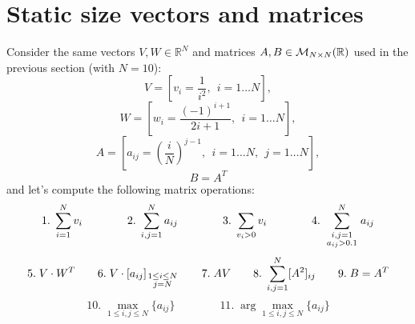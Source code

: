 

\FloatBarrier


\newpage 
\section{Static size vectors and matrices} 

Consider the same vectors $V, W \in \mathbb{R}^N$ and matrices $A, B \in { \cal{M}}_{N \times N} (\mathbb{R})$ used in the previous section (with $N=10$): 
$$
V = \left[ v_i =\frac{1}{i^2}, \ \ i = 1 \ldots  N \right],
$$
$$
W = \left[ w_i = \frac{(-1)^{i+1}}{2i+1}, \ \ i = 1 \ldots  N \right],
$$
$$
A = \left[ a_{ij} = \left( \frac{i}{N} \right)^{j-1}, \ \ i = 1 \ldots  N, \ \ j = 1 \ldots  N \right],
$$
$$
B = A^T
$$
and let's compute the following matrix operations:
$$
1.\;\sum_{i=1}^N v_i  \qquad \qquad 2.\;\sum_{i,j=1}^N a_{ij}   \qquad \qquad   3.\;\sum_{v_i>0} v_i   \qquad \qquad 4.\;\sum_{\scriptstyle i,j=1 \atop \scriptstyle a_{ij} > 0.1}^N a_{ij}   
$$
$$
5.\; V\cdot W^T    \quad \quad      6.\; V\cdot [a_{ij}]_{\scriptstyle 1\leq i\leq N \atop \scriptstyle j = N}    \quad  \quad  7.\; AV     \quad \quad   8.\;\sum_{i,j=1}^N [A^2]_{ij}   \quad \quad    9.\; B = A^T
$$
$$
10.\;\max_{1\leq i,j\leq N} \{ a_{ij} \}       \qquad \qquad     11.\;\arg\max_{1\leq i,j\leq N} \{ a_{ij} \}   
$$

